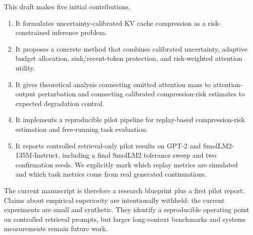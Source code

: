 This draft makes five initial contributions.

\begin{enumerate}[leftmargin=*]
    \item It formulates uncertainty-calibrated KV cache compression as a risk-constrained inference problem.
    \item It proposes a concrete \uckv{} method that combines calibrated uncertainty, adaptive budget allocation, sink/recent-token protection, and risk-weighted attention utility.
    \item It gives theoretical analysis connecting omitted attention mass to attention-output perturbation and connecting calibrated compression-risk estimates to expected degradation control.
    \item It implements a reproducible pilot pipeline for replay-based compression-risk estimation and free-running task evaluation.
    \item It reports controlled retrieval-only pilot results on GPT-2 and SmolLM2-135M-Instruct, including a final SmolLM2 tolerance sweep and two confirmation seeds. We explicitly mark which replay metrics are simulated and which task metrics come from real generated continuations.
\end{enumerate}

The current manuscript is therefore a research blueprint plus a first pilot report. Claims about empirical superiority are intentionally withheld: the current experiments are small and synthetic. They identify a reproducible operating point on controlled retrieval prompts, but larger long-context benchmarks and systems measurements remain future work.
